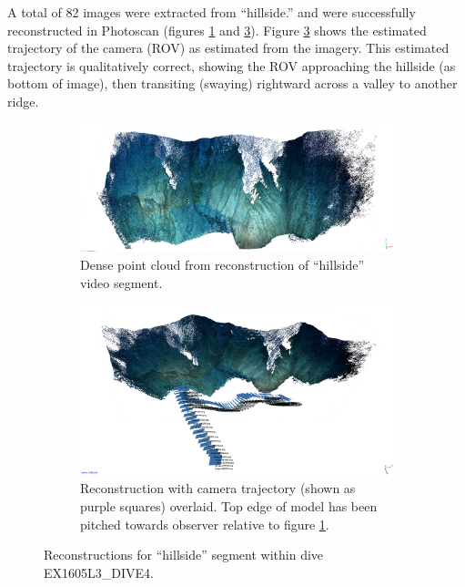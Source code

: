 \documentclass[letterpaper,12pt]{article}
\begin{document}
A total of 82 images were extracted from ``hillside.'' and were successfully reconstructed in Photoscan (figures \ref{fig:hillside_photoscan} and \ref{fig:hillside_photoscan_trajectory}).  Figure \ref{fig:hillside_photoscan_trajectory} shows the estimated trajectory of the camera (ROV) as estimated from the imagery.  This estimated trajectory is qualitatively correct, showing the ROV approaching the hillside (as bottom of image), then transiting (swaying) rightward across a valley to another ridge.   

\begin{figure}
    \centering
    \begin{subfigure}[b]{0.95\textwidth}
        \includegraphics[width=\textwidth]{images/hillside_reconstruction.png}
        \caption{Dense point cloud from reconstruction of ``hillside'' video segment.}
        \label{fig:hillside_photoscan}
    \end{subfigure}
    \begin{subfigure}[b]{0.95\textwidth}
        \includegraphics[width=\textwidth]{images/hillside_reconstruction_trajectory.png}
        \caption{Reconstruction with camera trajectory (shown as purple squares) overlaid.  Top edge of model has been pitched towards observer relative to figure \ref{fig:hillside_photoscan}. }
        \label{fig:hillside_photoscan_trajectory}
    \end{subfigure}
    \caption{Reconstructions for ``hillside'' segment within dive EX1605L3\_DIVE4.}
\end{figure}
\end{document}
